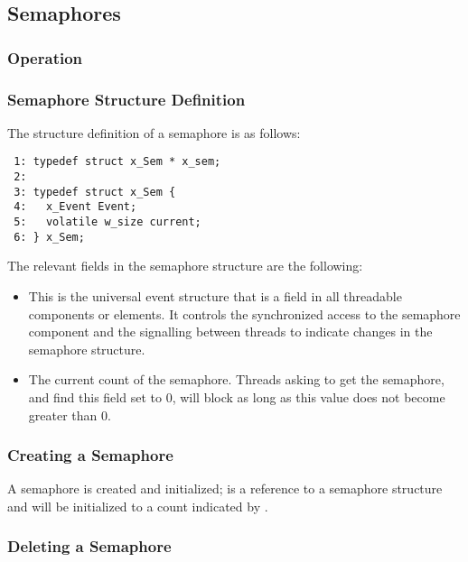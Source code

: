 %
%

\subsection{Semaphores}

\subsubsection{Operation}

\subsubsection{Semaphore Structure Definition}

The structure definition of a semaphore is as follows:

\bcode
\begin{verbatim}
 1: typedef struct x_Sem * x_sem;
 2:
 3: typedef struct x_Sem {
 4:   x_Event Event;
 5:   volatile w_size current;
 6: } x_Sem;
\end{verbatim}
\ecode

The relevant fields in the semaphore structure are the following:

\begin{itemize}
\item {} This is the universal event structure that is a field
in all threadable components or elements. It controls the synchronized access
to the semaphore component and the signalling between threads to indicate changes
in the semaphore structure.
\item {} The current count of the
semaphore. Threads asking to get the semaphore, and find this field set to
0, will block as long as this value does not become greater than 0.
\end{itemize}


\subsubsection{Creating a Semaphore}


A semaphore is created and initialized;  is a reference to a semaphore
structure and will be initialized to a count indicated by .

\subsubsection{Deleting a Semaphore}

